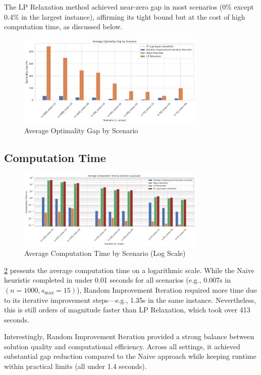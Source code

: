 The LP Relaxation method achieved near-zero gap in most scenarios (0\% except 0.4\% in the largest instance), affirming its tight bound but at the cost of high computation time, as discussed below.

\begin{figure}[htbp]
    \centering
    \includegraphics[width=0.8\textwidth]{assets/gap.png}
    \caption{Average Optimality Gap by Scenario}
    \label{fig:avg-optimality-gap}
\end{figure}

\subsection{Computation Time}

\begin{figure}[htbp]
    \centering
    \includegraphics[width=0.8\textwidth]{assets/time.png}
    \caption{Average Computation Time by Scenario (Log Scale)}
    \label{fig:avg-computation-time}
\end{figure}

\cref{fig:avg-computation-time} presents the average computation time on a logarithmic scale.
While the Naive heuristic completed in under 0.01 seconds for all scenarios (e.g., 0.007s in $(n=1000, s_{\max}=15)$),
Random Improvement Iteration required more time due to its iterative improvement steps—e.g., 1.35s in the same instance.
Nevertheless, this is still orders of magnitude faster than LP Relaxation, which took over 413 seconds.

Interestingly, Random Improvement Iteration provided a strong balance between solution quality and computational efficiency.
Across all settings, it achieved substantial gap reduction compared to
the Naive approach while keeping runtime within practical limits (all under 1.4 seconds).


